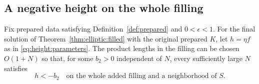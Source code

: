 \subsection{A negative height on the whole filling}

\begin{lemma}\label{lem:height:ramp}
Fix prepared data satisfying Definition~\ref{def:prepared} and
$0<\epsilon<1$.  For the final solution of
Theorem~\ref{thm:elliptic:filled} with the original prepared $K$,
let $h=\eta f$ as in \eqref{eq:height:parameters}.
The product lengths in the filling can be chosen $O(1+N)$ so that, for
some $b_2>0$ independent of $N$, every sufficiently large $N$ satisfies
\begin{equation}\label{eq:height:negative-core}
 h<-b_2
 \quad\text{on the whole added filling and a neighborhood of }S.
\end{equation}
\end{lemma}

